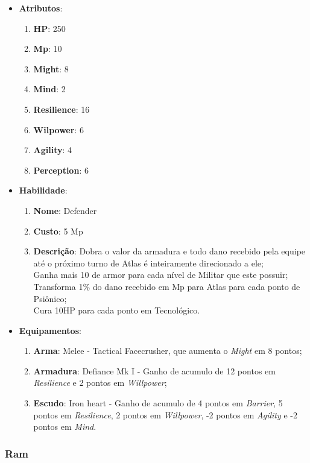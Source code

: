 \documentclass[11pt]{article} %
\begin{document}
\begin{itemize}
\item \textbf{Atributos}:
  \begin{enumerate}
    \item \textbf{HP}: 250
    \item \textbf{Mp}: 10
    \item \textbf{Might}: 8
    \item \textbf{Mind}: 2
    \item \textbf{Resilience}: 16
    \item \textbf{Wilpower}: 6
    \item \textbf{Agility}: 4
    \item \textbf{Perception}: 6
  \end{enumerate}
\item \textbf{Habilidade}:
  \begin{enumerate}
    \item \textbf{Nome}: Defender
    \item \textbf{Custo}: 5 Mp
    \item \textbf{Descrição}: Dobra o valor da armadura e todo dano recebido pela equipe até o próximo turno de Atlas é inteiramente direcionado a ele;\\
    Ganha mais 10 de armor para cada nível de Militar que este possuir;\\
    Transforma 1\% do dano recebido em Mp para Atlas para cada ponto de Psiônico;\\
    Cura 10HP para cada ponto em Tecnológico.
  \end{enumerate}
\item \textbf{Equipamentos}:
  \begin{enumerate}
    \item \textbf{Arma}: Melee - Tactical Facecrusher, que aumenta o \textit{Might} em 8 pontos;
    \item \textbf{Armadura}: Defiance Mk I - Ganho de acumulo de 12 pontos em \textit{Resilience} e 2 pontos em \textit{Willpower};
    \item \textbf{Escudo}: Iron heart - Ganho de acumulo de 4 pontos em \textit{Barrier}, 5 pontos em \textit{Resilience}, 2 pontos em \textit{Willpower}, -2 pontos em \textit{Agility} e -2 pontos em \textit{Mind}.
  \end{enumerate}
\end{itemize}

\subsubsection{Ram}
\end{document}
